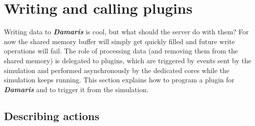 \documentclass[11pt]{report}
\newcommand{\Damaris}{\emph{\textbf{Damaris}}}
\begin{document}
\chapter{Writing and calling plugins}

Writing data to \Damaris{} is cool, but what should the server do with them? For now the shared memory
buffer will simply get quickly filled and future write operations will fail. The role of processing data
(and removing them from the shared memory) is delegated to plugins, which are triggered by events
sent by the simulation and performed asynchronously by the dedicated cores while the simulation keeps running.
This section explains how to program a plugin for \Damaris{} and to trigger it from the simulation.

\section{Describing actions}
\end{document}
